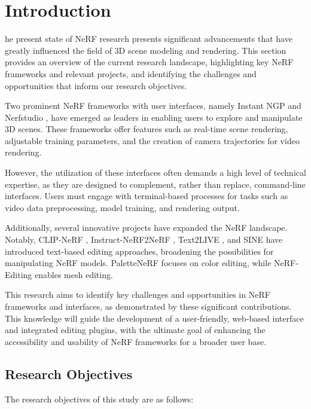 %
\chapter{Introduction}
\label{sec:intro}

he present state of NeRF research presents significant advancements that have greatly influenced the field of 3D scene modeling and rendering. This section provides an overview of the current research landscape, highlighting key NeRF frameworks and relevant projects, and identifying the challenges and opportunities that inform our research objectives.

Two prominent NeRF frameworks with user interfaces, namely Instant NGP \cite{mueller2022instant} and Nerfstudio \cite{nerfstudio}, have emerged as leaders in enabling users to explore and manipulate 3D scenes. These frameworks offer features such as real-time scene rendering, adjustable training parameters, and the creation of camera trajectories for video rendering.

However, the utilization of these interfaces often demands a high level of technical expertise, as they are designed to complement, rather than replace, command-line interfaces. Users must engage with terminal-based processes for tasks such as video data preprocessing, model training, and rendering output.

Additionally, several innovative projects have expanded the NeRF landscape. Notably, CLIP-NeRF \cite{CLIP-NeRF}, Instruct-NeRF2NeRF \cite{instructnerf2023}, Text2LIVE \cite{bartal2022text2live}, and SINE \cite{bao2023sine} have introduced text-based editing approaches, broadening the possibilities for manipulating NeRF models. PaletteNeRF \cite{wu2022palettenerf} focuses on color editing, while NeRF-Editing \cite{NeRF-Editing} enables mesh editing.

This research aims to identify key challenges and opportunities in NeRF frameworks and interfaces, as demonstrated by these significant contributions. This knowledge will guide the development of a user-friendly, web-based interface and integrated editing plugins, with the ultimate goal of enhancing the accessibility and usability of NeRF frameworks for a broader user base.

\section{Research Objectives}
\label{sec:intro:objectives}

The research objectives of this study are as follows:

